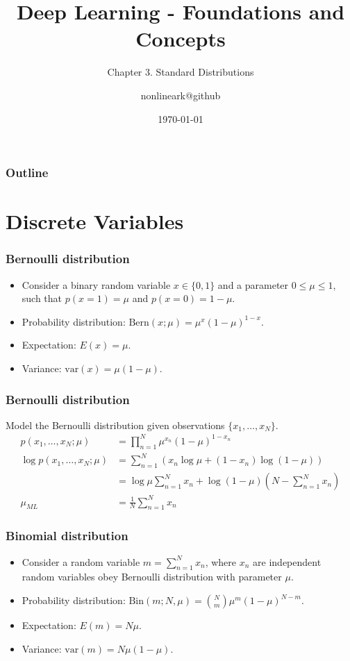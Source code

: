 \documentclass{beamer}
\title{Deep Learning - Foundations and Concepts}
\subtitle{Chapter 3. Standard Distributions}
\author{nonlineark@github}
\date{\today}
\begin{document}
\begin{frame}
    \titlepage
\end{frame}

\begin{frame}
    \frametitle{Outline}
    \tableofcontents
\end{frame}

\section{Discrete Variables}

\begin{frame}
    \frametitle{Bernoulli distribution}
    \begin{itemize}
        \item Consider a binary random variable $x\in\{0,1\}$ and a parameter $0\le\mu\le{}1$, such that $p(x=1)=\mu$ and $p(x=0)=1-\mu$.
        \item Probability distribution: $\mathrm{Bern}(x;\mu)=\mu^{x}(1-\mu)^{1-x}$.
        \item Expectation: $E(x)=\mu$.
        \item Variance: $\mathrm{var}(x)=\mu(1-\mu)$.
    \end{itemize}
\end{frame}

\begin{frame}
    \frametitle{Bernoulli distribution}
    Model the Bernoulli distribution given observations $\{x_{1},\hdots,x_{N}\}$.
    \begin{align*}
        p(x_{1},\hdots,x_{N};\mu)&=\prod_{n=1}^{N}\mu^{x_{n}}(1-\mu)^{1-x_{n}} \\
        \log{}p(x_{1},\hdots,x_{N};\mu)&=\sum_{n=1}^{N}(x_{n}\log\mu+(1-x_{n})\log(1-\mu)) \\
        &=\log\mu\sum_{n=1}^{N}x_{n}+\log(1-\mu)(N-\sum_{n=1}^{N}x_{n}) \\
        \mu_{ML}&=\frac{1}{N}\sum_{n=1}^{N}x_{n}
    \end{align*}
\end{frame}

\begin{frame}
    \frametitle{Binomial distribution}
    \begin{itemize}
        \item Consider a random variable $m=\sum_{n=1}^{N}x_{n}$, where $x_{n}$ are independent random variables obey Bernoulli distribution with parameter $\mu$.
        \item Probability distribution: $\mathrm{Bin}(m;N,\mu)=\binom{N}{m}\mu^{m}(1-\mu)^{N-m}$.
        \item Expectation: $E(m)=N\mu$.
        \item Variance: $\mathrm{var}(m)=N\mu(1-\mu)$.
    \end{itemize}
\end{frame}
\end{document}
